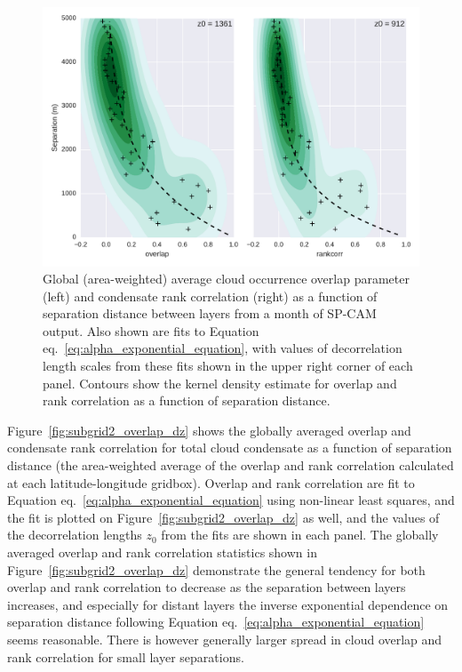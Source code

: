 \begin{figure}[htbp]
\centering
\includegraphics{graphics/subgrid2_overlap_dz.pdf}
\caption{\label{fig:subgrid2_overlap_dz}Global (area-weighted) average
cloud occurrence overlap parameter (left) and condensate rank
correlation (right) as a function of separation distance between layers
from a month of SP-CAM output. Also shown are fits to Equation
eq.~\ref{eq:alpha_exponential_equation}, with values of decorrelation
length scales from these fits shown in the upper right corner of each
panel. Contours show the kernel density estimate for overlap and rank
correlation as a function of separation
distance.}\label{fig:subgrid2ux5foverlapux5fdz}
\end{figure}

Figure~\ref{fig:subgrid2_overlap_dz} shows the globally averaged overlap
and condensate rank correlation for total cloud condensate as a function
of separation distance (the area-weighted average of the overlap and
rank correlation calculated at each latitude-longitude gridbox). Overlap
and rank correlation are fit to Equation
eq.~\ref{eq:alpha_exponential_equation} using non-linear least squares,
and the fit is plotted on Figure~\ref{fig:subgrid2_overlap_dz} as well,
and the values of the decorrelation lengths \(z_0\) from the fits are
shown in each panel. The globally averaged overlap and rank correlation
statistics shown in Figure~\ref{fig:subgrid2_overlap_dz} demonstrate the
general tendency for both overlap and rank correlation to decrease as
the separation between layers increases, and especially for distant
layers the inverse exponential dependence on separation distance
following Equation eq.~\ref{eq:alpha_exponential_equation} seems
reasonable. There is however generally larger spread in cloud overlap
and rank correlation for small layer separations.


